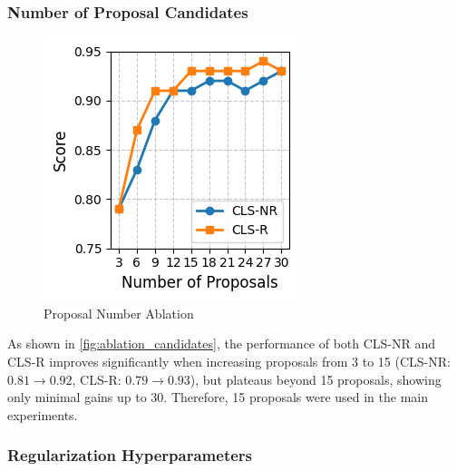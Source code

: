\subsubsection{Number of Proposal Candidates}
\label{sec:number_of_proposal_candidates}

\begin{figure}
    \vspace{-0.5cm}
    \centering
    \includegraphics{imgs/prop-num-abl.png}
    \caption{Proposal Number Ablation}
\end{figure}

As shown in \ref{fig:ablation_candidates}, the performance of both CLS-NR and CLS-R improves significantly when increasing proposals from 3 to 15 (CLS-NR: $0.81 \rightarrow 0.92$, CLS-R: $0.79 \rightarrow 0.93$), but plateaus beyond 15 proposals, showing only minimal gains up to 30. Therefore, 15 proposals were used in the main experiments.

\subsubsection{Regularization Hyperparameters}
\label{sec:regularization_hyperparameters}

